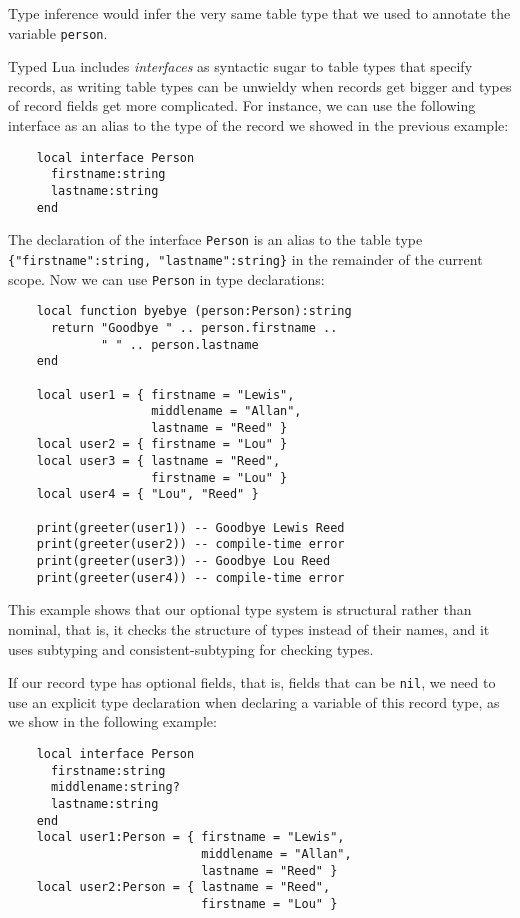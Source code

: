 Type inference would infer the very same table type that we used to
annotate the variable \texttt{person}.

Typed Lua includes \emph{interfaces} as syntactic sugar to table types
that specify records, as writing table types can be unwieldy when
records get bigger and types of record fields get more complicated.
For instance, we can use the following interface as an alias to the
type of the record we showed in the previous example:
\begin{verbatim}
    local interface Person
      firstname:string
      lastname:string
    end
\end{verbatim}

The declaration of the interface \texttt{Person} is an alias to the
table type \texttt{\{"firstname":string, "lastname":string\}} in the
remainder of the current scope.
Now we can use \texttt{Person} in type declarations:
\begin{verbatim}
    local function byebye (person:Person):string
      return "Goodbye " .. person.firstname ..
             " " .. person.lastname
    end

    local user1 = { firstname = "Lewis",
                    middlename = "Allan",
                    lastname = "Reed" }
    local user2 = { firstname = "Lou" }
    local user3 = { lastname = "Reed",
                    firstname = "Lou" }
    local user4 = { "Lou", "Reed" }

    print(greeter(user1)) -- Goodbye Lewis Reed 
    print(greeter(user2)) -- compile-time error
    print(greeter(user3)) -- Goodbye Lou Reed
    print(greeter(user4)) -- compile-time error
\end{verbatim}

This example shows that our optional type system is structural rather
than nominal, that is, it checks the structure of types instead of
their names, and it uses subtyping and consistent-subtyping for
checking types.

If our record type has optional fields, that is, fields that can be \texttt{nil},
we need to use an explicit type declaration when declaring a
variable of this record type, as we show in the following example:
\begin{verbatim}
    local interface Person
      firstname:string
      middlename:string?
      lastname:string
    end
    local user1:Person = { firstname = "Lewis",
                           middlename = "Allan",
                           lastname = "Reed" }
    local user2:Person = { lastname = "Reed",
                           firstname = "Lou" }
\end{verbatim}

